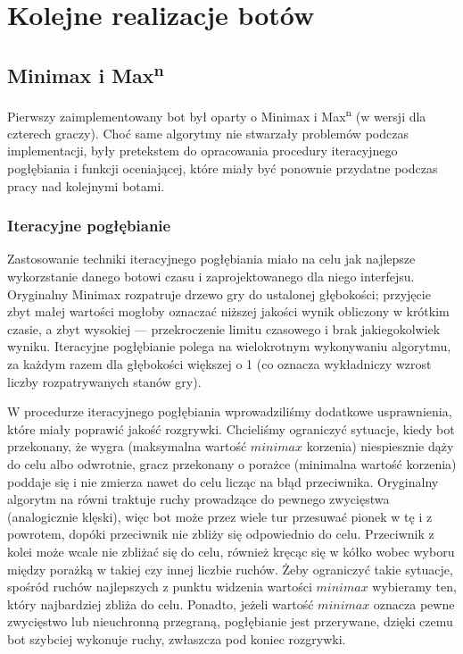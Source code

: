 \documentclass{pracamgr}
\begin{document}
\chapter{Kolejne realizacje botów}

\section{Minimax i Max\textsuperscript{n}}

Pierwszy zaimplementowany bot był oparty o Minimax i Max\textsuperscript{n} (w wersji dla czterech graczy).
Choć same algorytmy nie stwarzały problemów podczas implementacji, były pretekstem do opracowania procedury iteracyjnego pogłębiania i funkcji oceniającej, które miały być ponownie przydatne podczas pracy nad kolejnymi botami.

\subsection{Iteracyjne pogłębianie}

Zastosowanie techniki iteracyjnego pogłębiania miało na celu jak najlepsze wykorzstanie danego botowi czasu i zaprojektowanego dla niego interfejsu.
Oryginalny Minimax rozpatruje drzewo gry do ustalonej głębokości; przyjęcie zbyt małej wartości mogłoby oznaczać niższej jakości wynik obliczony w krótkim czasie, a zbyt wysokiej --- przekroczenie limitu czasowego i brak jakiegokolwiek wyniku.
Iteracyjne pogłębianie polega na wielokrotnym wykonywaniu algorytmu, za każdym razem dla głębokości większej o 1 (co oznacza wykładniczy wzrost liczby rozpatrywanych stanów gry).

W procedurze iteracyjnego pogłębiania wprowadziliśmy dodatkowe usprawnienia, które miały poprawić jakość rozgrywki.
Chcieliśmy ograniczyć sytuacje, kiedy bot przekonany, że wygra (maksymalna wartość \(minimax\) korzenia) niespiesznie dąży do celu albo odwrotnie, gracz przekonany o porażce (minimalna wartość korzenia) poddaje się i nie zmierza nawet do celu licząc na błąd przeciwnika.
Oryginalny algorytm na równi traktuje ruchy prowadzące do pewnego zwycięstwa (analogicznie klęski), więc bot może przez wiele tur przesuwać pionek w tę i z powrotem, dopóki przeciwnik nie zbliży się odpowiednio do celu.
Przeciwnik z kolei może wcale nie zbliżać się do celu, również kręcąc się w kółko wobec wyboru między porażką w takiej czy innej liczbie ruchów.
Żeby ograniczyć takie sytuacje, spośród ruchów najlepszych z punktu widzenia wartości \(minimax\) wybieramy ten, który najbardziej zbliża do celu.
Ponadto, jeżeli wartość \(minimax\) oznacza pewne zwycięstwo lub nieuchronną przegraną, pogłębianie jest przerywane, dzięki czemu bot szybciej wykonuje ruchy, zwłaszcza pod koniec rozgrywki.
\end{document}
